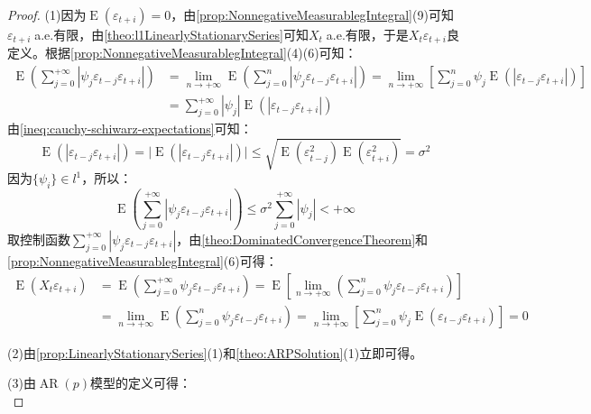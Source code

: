 \begin{proof}
	(1)因为$\operatorname{E}(\varepsilon_{t+i})=0$，由\cref{prop:NonnegativeMeasurablegIntegral}(9)可知$\varepsilon_{t+i}\;$a.e.有限，由\cref{theo:l1LinearlyStationarySeries}可知$X_t\;$a.e.有限，于是$X_t\varepsilon_{t+i}$良定义。根据\cref{prop:NonnegativeMeasurablegIntegral}(4)(6)可知：
	\begin{align*}
		\operatorname{E}\left(\sum_{j=0}^{+\infty}|\psi_j\varepsilon_{t-j}\varepsilon_{t+i}|\right)
		&=\lim_{n\to+\infty}\operatorname{E}\left(\sum_{j=0}^{n}|\psi_j\varepsilon_{t-j}\varepsilon_{t+i}|\right)
		=\lim_{n\to+\infty}\left[\sum_{j=0}^{n}\psi_j\operatorname{E}(|\varepsilon_{t-j}\varepsilon_{t+i}|)\right] \\
		&=\sum_{j=0}^{+\infty}|\psi_j|\operatorname{E}(|\varepsilon_{t-j}\varepsilon_{t+i}|)
	\end{align*}
	由\cref{ineq:cauchy-schiwarz-expectations}可知：
	\begin{equation*}
		\operatorname{E}(|\varepsilon_{t-j}\varepsilon_{t+i}|)=\Big|\operatorname{E}(|\varepsilon_{t-j}\varepsilon_{t+i}|)\Big|\leqslant\sqrt{\operatorname{E}(\varepsilon_{t-j}^2)\operatorname{E}(\varepsilon_{t+i}^2)}=\sigma^2
	\end{equation*}
	因为$\{\psi_i\}\in l^1$，所以：
	\begin{equation*}
		\operatorname{E}\left(\sum_{j=0}^{+\infty}|\psi_j\varepsilon_{t-j}\varepsilon_{t+i}|\right)\leqslant\sigma^2\sum_{j=0}^{+\infty}|\psi_j|<+\infty
	\end{equation*}
	取控制函数$\sum\limits_{j=0}^{+\infty}|\psi_j\varepsilon_{t-j}\varepsilon_{t+i}|$，由\cref{theo:DominatedConvergenceTheorem}和\cref{prop:NonnegativeMeasurablegIntegral}(6)可得：
	\begin{align*}
		\operatorname{E}(X_t\varepsilon_{t+i})&=\operatorname{E}\left(\sum_{j=0}^{+\infty}\psi_j\varepsilon_{t-j}\varepsilon_{t+i}\right)=\operatorname{E}\left[\lim_{n\to+\infty}\left(\sum_{j=0}^{n}\psi_j\varepsilon_{t-j}\varepsilon_{t+i}\right)\right] \\
		&=\lim_{n\to+\infty}\operatorname{E}\left(\sum_{j=0}^{n}\psi_j\varepsilon_{t-j}\varepsilon_{t+i}\right)=\lim_{n\to+\infty}\left[\sum_{j=0}^{n}\psi_j\operatorname{E}(\varepsilon_{t-j}\varepsilon_{t+i})\right]=0
	\end{align*}\par
	(2)由\cref{prop:LinearlyStationarySeries}(1)和\cref{theo:ARPSolution}(1)立即可得。\par
	(3)由$\operatorname{AR}(p)$模型的定义可得：
	\begin{equation*}

\end{equation*}
\end{proof}
